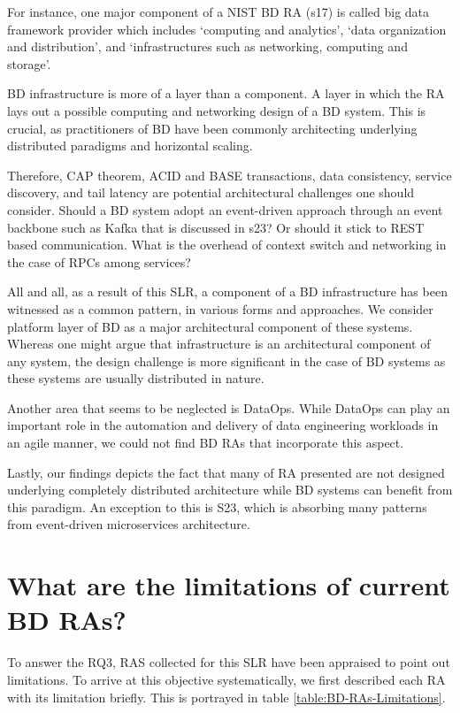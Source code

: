 \documentclass{ieeeaccess}
\begin{document}
For instance, one major component of a NIST BD RA (s17) is called big data framework provider which includes ‘computing and analytics’, ‘data organization and distribution’, and ‘infrastructures such as networking, computing and storage’.  

 BD infrastructure is more of a layer than a component. A layer in which the RA lays out a possible computing and networking design of a BD system. This is crucial, as practitioners of BD have been commonly architecting underlying distributed paradigms and horizontal scaling. 

Therefore, CAP theorem, ACID and BASE transactions, data consistency, service discovery, and tail latency are potential architectural challenges one should consider. Should a BD system adopt an event-driven approach through an event backbone such as Kafka that is discussed in s23? Or should it stick to REST based communication. What is the overhead of context switch and networking in the case of RPCs among services?  

All and all, as a result of this SLR, a component of a BD infrastructure has been witnessed as a common pattern, in various forms and approaches. We consider platform layer of BD as a major architectural component of these systems. Whereas one might argue that infrastructure is an architectural component of any system, the design challenge is more significant in the case of BD systems as these systems are usually distributed in nature.

Another area that seems to be neglected is DataOps. While DataOps can play an important role in the automation and delivery of data engineering workloads in an agile manner, we could not find BD RAs that incorporate this aspect.

Lastly, our findings depicts the fact that many of RA presented are not designed underlying completely distributed architecture while BD systems can benefit from this paradigm. An exception to this is S23, which is absorbing many patterns from event-driven microservices architecture.

\section{What are the limitations of current BD RAs?}

To answer the RQ3, RAS collected for this SLR have been appraised to point out limitations. To arrive at this objective systematically, we first described each RA with its limitation briefly. This is portrayed in table \ref{table:BD-RAs-Limitations}.
\end{document}
